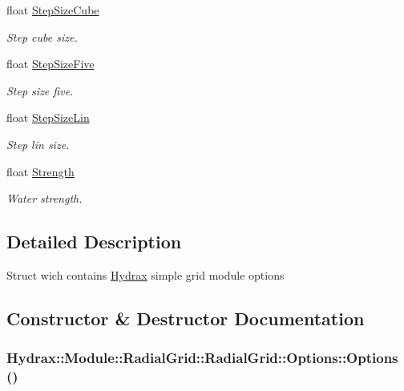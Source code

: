 \begin{CompactItemize}
float \hyperlink{struct_hydrax_1_1_module_1_1_radial_grid_1_1_options_e405499a76f4c1805c559901fbdad2cd}{StepSizeCube}
\begin{CompactList}\small\item\em Step cube size. \item\end{CompactList}\item 
float \hyperlink{struct_hydrax_1_1_module_1_1_radial_grid_1_1_options_fb39f5d35557b182254e6685251b17df}{StepSizeFive}
\begin{CompactList}\small\item\em Step size five. \item\end{CompactList}\item 
float \hyperlink{struct_hydrax_1_1_module_1_1_radial_grid_1_1_options_933a688b6f7230ad6ff130298edbb795}{StepSizeLin}
\begin{CompactList}\small\item\em Step lin size. \item\end{CompactList}\item 
float \hyperlink{struct_hydrax_1_1_module_1_1_radial_grid_1_1_options_8f11d4879ffadedf6c1ba0519e0bbbfc}{Strength}
\begin{CompactList}\small\item\em Water strength. \item\end{CompactList}\end{CompactItemize}


\subsection{Detailed Description}
Struct wich contains \hyperlink{class_hydrax_1_1_hydrax}{Hydrax} simple grid module options 

\subsection{Constructor \& Destructor Documentation}
\hypertarget{struct_hydrax_1_1_module_1_1_radial_grid_1_1_options_124d0f633f807b2cd7e8f4409a76fbc4}{
\subsubsection[{Options}]{\setlength{\rightskip}{0pt plus 5cm}Hydrax::Module::RadialGrid::RadialGrid::Options::Options ()}}
\label{struct_hydrax_1_1_module_1_1_radial_grid_1_1_options_124d0f633f807b2cd7e8f4409a76fbc4}


